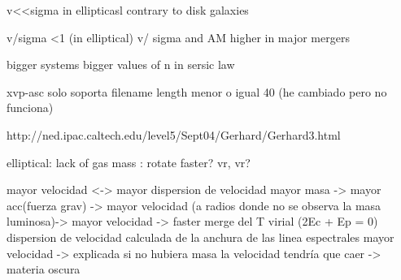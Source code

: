 \documentclass[12pt]{book}
\begin{document}
v<<sigma in ellipticasl contrary to disk galaxies

v/sigma <1 (in elliptical)
v/ sigma and AM higher in major mergers

bigger systems bigger values of n in sersic law


xvp-asc solo soporta filename length menor o igual 40 (he cambiado pero no funciona)

http://ned.ipac.caltech.edu/level5/Sept04/Gerhard/Gerhard3.html


elliptical: lack of gas
mass : rotate faster? vr, vr?

mayor velocidad <-> mayor dispersion de velocidad
mayor masa -> mayor acc(fuerza grav) -> mayor velocidad (a radios donde no se observa la masa luminosa)-> mayor velocidad -> faster merge
del T virial (2Ec + Ep = 0)
dispersion de velocidad calculada de la anchura de las linea espectrales 
mayor velocidad -> explicada  si no hubiera masa la velocidad tendría que caer -> materia oscura 
\end{document}
